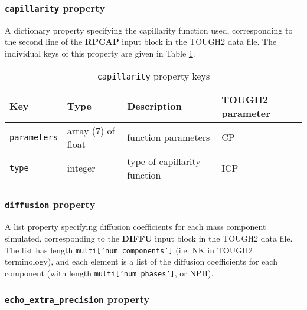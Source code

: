 \begin{snugshade}
\subsubsection{\texttt{capillarity} property}
\end{snugshade}
\label{sec:t2data:capillarity}

A dictionary property specifying the capillarity function used, corresponding to the second line of the \textbf{RPCAP} input block in the TOUGH2 data file.  The individual keys of this property are given in Table \ref{tb:capillarity}.

\begin{table}
  \begin{center}
    \begin{tabular}{|l|l|l|l|}
      \hline
      \textbf{Key} & \textbf{Type} & \textbf{Description} & \textbf{TOUGH2 parameter}\\
      \hline
      \texttt{parameters} & array (7) of float & function parameters & CP\\
      \texttt{type} & integer & type of capillarity function & ICP\\
      \hline
    \end{tabular}
    \caption{\texttt{capillarity} property keys}
    \label{tb:capillarity}
  \end{center}
\end{table}

\begin{snugshade}
\subsubsection{\texttt{diffusion} property}
\end{snugshade}
\label{sec:t2data:diffusion}

A list property specifying diffusion coefficients for each mass component simulated, corresponding to the \textbf{DIFFU} input block in the TOUGH2 data file.  The list has length \texttt{multi['num\_components']} (i.e. NK in TOUGH2 terminology), and each element is a list of the diffusion coefficients for each component (with length \texttt{multi['num\_phases']}, or NPH).

\begin{snugshade}
\subsubsection{\texttt{echo\_extra\_precision} property}
\end{snugshade}
\label{sec:t2data:echo_extra_precision}

